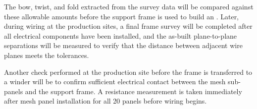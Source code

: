 The bow, twist, and fold extracted from the survey data will be compared against these allowable amounts before the support frame is used to build an .  Later, during  wiring at the production sites, a final frame survey will be completed after all electrical components have been installed, and the as-built plane-to-plane separations will be measured to verify that the distance between adjacent wire planes meets the tolerances.  

Another check performed at the  production site before the frame is transferred to a winder will be to confirm sufficient electrical contact between the mesh sub-panels and the  support frame.  A resistance measurement is taken immediately after mesh panel installation for all \num{20} panels before wiring begins.








